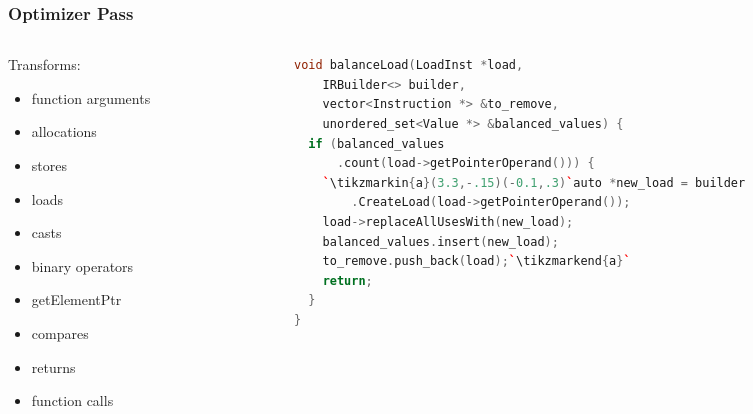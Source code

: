 \documentclass[11pt,t,usepdftitle=false,aspectratio=169]{beamer}
\begin{document}
\begin{frame}[fragile]
  \frametitle{Optimizer Pass}

  \begin{columns}[T]
    \begin{column}{0.3\textwidth}
      Transforms:
      \begin{itemize}
      \item function arguments
      \item allocations
      \item stores
      \item \textcolor<2>{uibkorange}{loads} \quad {}
      \item casts
      \item binary operators
      \item getElementPtr
      \item compares
      \item returns
      \item function calls
      \end{itemize}
    \end{column}
    \hfill
    \pause
    \vrule
    \hfill
    \begin{column}{0.6\textwidth}
      \begin{lstlisting}[language=C++,basicstyle=\small]
void balanceLoad(LoadInst *load,
    IRBuilder<> builder,
    vector<Instruction *> &to_remove,
    unordered_set<Value *> &balanced_values) {
  if (balanced_values
      .count(load->getPointerOperand())) {
    `\tikzmarkin{a}(3.3,-.15)(-0.1,.3)`auto *new_load = builder
        .CreateLoad(load->getPointerOperand());
    load->replaceAllUsesWith(new_load);
    balanced_values.insert(new_load);
    to_remove.push_back(load);`\tikzmarkend{a}`
    return;
  }
}
      \end{lstlisting}
    \end{column}
  \end{columns}
\end{frame}
\end{document}
